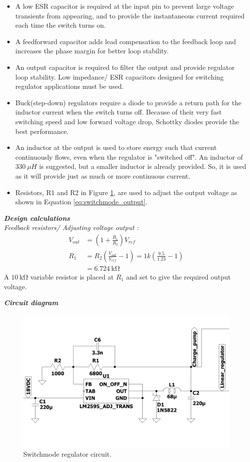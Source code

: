\begin{itemize}
    \item A low ESR capacitor is required at the input pin to prevent large voltage transients from appearing, and to provide the instantaneous current required each time the switch turns on.
    \item A feedforward capacitor adds lead compensation to the feedback loop and increases
    the phase margin for better loop stability.
    \item An output capacitor is required to filter the output and provide regulator loop stability. Low impedance/ ESR capacitors designed for switching regulator applications must be used.
    \item Buck(step-down) regulators require a diode to provide a return path for the inductor current when the switch turns off. Because of their very fast switching speed and low forward voltage drop, Schottky diodes provide the best performance.
    \item An inductor at the output is used to store energy such that current continuously flows, even when the regulator is "switched off". An inductor of $\SI{330}{\mu H}$ is suggested, but a smaller inductor is already provided. So, it is used as it will provide just as much or more continuous current.
    \item Resistors, R1 and R2 in Figure \ref{fig:switchmode_circuit}, are used to adjust the output voltage as shown in Equation \ref{eq:switchmode_output}.
    
\end{itemize}


\noindent\textbf{\textit{Design calculations}} \\
\textit{Feedback resistors/ Adjusting voltage output \cite{LM2595}:}
\begin{equation} \label{eq:switchmode_output}
    \begin{split}
        V_{out} &= (1+\frac{R_1}{R_2})V_{ref} \\
        R_1 &= R_2(\frac{V_{out}}{V_{ref}}-1) 
        = 1k(\frac{9.5}{1.23}-1) \\
        &=\SI{6.724}{\kilo\ohm}
    \end{split}
\end{equation}
A $\SI{10}{\kilo\ohm}$ variable resistor is placed at $R_1$ and set to give the required output voltage.


\noindent\textbf{\textit{Circuit diagram}}
\begin{figure}[h!]
 \centering
  	\includegraphics[width=0.55
  	\linewidth,clip,trim = 0cm 2.5cm 0cm 1cm]{./Figures/switchmode_circuit.pdf}
  	\caption{Switchmode regulator circuit.}
  	\label{fig:switchmode_circuit}
 \end{figure}


